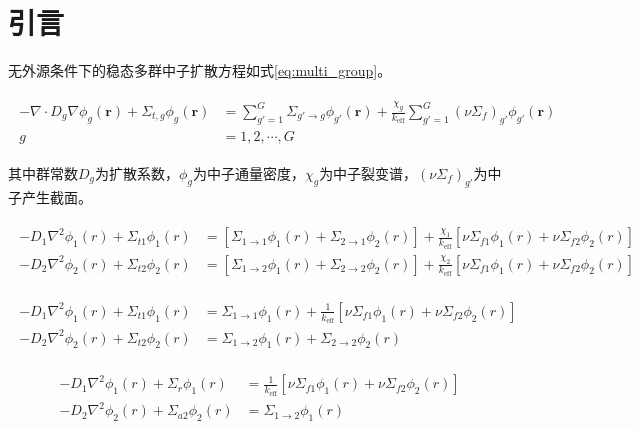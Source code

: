 \section{引言}

无外源条件下的稳态多群中子扩散方程如式\ref{eq:multi_group}。

\begin{align}
    \label{eq:multi_group}
    \begin{split}
        -\nabla\cdot D_g\nabla\phi_g(\pmb{r}) + \Sigma_{t,g}\phi_g(\pmb{r}) &= \sum_{g'=1}^G\Sigma_{g'\rightarrow g}\phi_{g'}(\pmb{r}) + \frac{\chi_g}{k_\mathrm{eff}}\sum_{g'=1}^G(\nu\Sigma_f)_{g'}\phi_{g'}(\pmb{r}) \\
        g &= 1,2,\cdots,G
    \end{split}
\end{align}

其中群常数$D_g$为扩散系数，$\phi_g$为中子通量密度，$\chi_g$为中子裂变谱，$(\nu\Sigma_f)_{g'}$为中子产生截面。

\begin{align}
    \label{eq:two_group}
    \begin{split}
        -D_1\nabla^2\phi_1(r) + \Sigma_{t1}\phi_1(r) &= \left[\Sigma_{1\rightarrow 1}\phi_1(r) + \Sigma_{2\rightarrow 1}\phi_2(r)\right] + \frac{\chi_1}{k_\mathrm{eff}}\left[\nu\Sigma_{f1}\phi_1(r)+\nu\Sigma_{f2}\phi_2(r)\right] \\
        -D_2\nabla^2\phi_2(r) + \Sigma_{t2}\phi_2(r) &= \left[\Sigma_{1\rightarrow 2}\phi_1(r) + \Sigma_{2\rightarrow 2}\phi_2(r)\right] + \frac{\chi_2}{k_\mathrm{eff}}\left[\nu\Sigma_{f1}\phi_1(r)+\nu\Sigma_{f2}\phi_2(r)\right]
    \end{split}
\end{align}

\begin{align}
    \label{eq:two2_group}
    \begin{split}
        -D_1\nabla^2\phi_1(r) + \Sigma_{t1}\phi_1(r) &= \Sigma_{1\rightarrow 1}\phi_1(r) + \frac{1}{k_\mathrm{eff}}\left[\nu\Sigma_{f1}\phi_1(r)+\nu\Sigma_{f2}\phi_2(r)\right] \\
        -D_2\nabla^2\phi_2(r) + \Sigma_{t2}\phi_2(r) &= \Sigma_{1\rightarrow 2}\phi_1(r) + \Sigma_{2\rightarrow 2}\phi_2(r)
    \end{split}
\end{align}

\begin{align}
    \label{eq:two3_group}
    \begin{split}
        -D_1\nabla^2\phi_1(r) + \Sigma_r\phi_1(r) &= \frac{1}{k_\mathrm{eff}}\left[\nu\Sigma_{f1}\phi_1(r)+\nu\Sigma_{f2}\phi_2(r)\right] \\
        -D_2\nabla^2\phi_2(r) + \Sigma_{a2}\phi_2(r) &= \Sigma_{1\rightarrow 2}\phi_1(r)
    \end{split}
\end{align}

